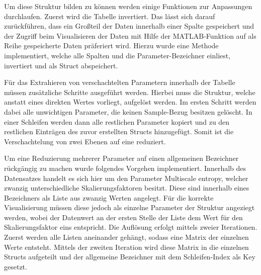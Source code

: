 Um diese Struktur bilden zu können werden einige Funktionen zur Anpassungen durchlaufen. Zuerst wird die Tabelle invertiert. Das lässt sich darauf zurückführen, dass ein Großteil der Daten innerhalb einer Spalte gespeichert und der Zugriff beim Visualisieren der Daten mit Hilfe der MATLAB-Funktion auf als Reihe gespeicherte Daten präferiert wird. Hierzu wurde eine Methode implementiert, welche alle Spalten und die Parameter-Bezeichner einliest, invertiert und als Struct abspeichert.



Für das Extrahieren von verschachtelten Parametern innerhalb der Tabelle müssen zusätzliche Schritte ausgeführt werden. Hierbei muss die Struktur, welche anstatt eines direkten Wertes vorliegt, aufgelöst werden. Im ersten Schritt werden dabei alle unwichtigen Parameter, die keinen Sample-Bezug besitzen gelöscht. In einer Schleifen werden dann alle restlichen Parameter kopiert und zu den restlichen Einträgen des zuvor erstellten Structs hinzugefügt. Somit ist die Verschachtelung von zwei Ebenen auf eine reduziert.



Um eine Reduzierung mehrerer Parameter auf einen allgemeinen Bezeichner rückgängig zu machen wurde folgendes Vorgehen implementiert. Innerhalb des Datensatzes handelt es sich hier um den Parameter \glqq Multiscale entropy\grqq{}, welcher zwanzig unterschiedliche Skalierungsfaktoren besitzt. Diese sind innerhalb eines Bezeichners als Liste aus zwanzig Werten angelegt. Für die korrekte Visualisierung müssen diese jedoch als einzelne Parameter der Struktur angeziegt werden, wobei der Datenwert an der ersten Stelle der Liste dem Wert für den Skalierungsfaktor eins entspricht. Die Auflösung erfolgt mittels zweier Iterationen. Zuerst werden alle Listen aneinander gehängt, sodass eine Matrix der einzelnen Werte entsteht. Mittels der zweiten Iteration wird diese Matrix in die einzelnen Structs aufgeteilt und der allgemeine Bezeichner mit dem Schleifen-Index als Key gesetzt.



